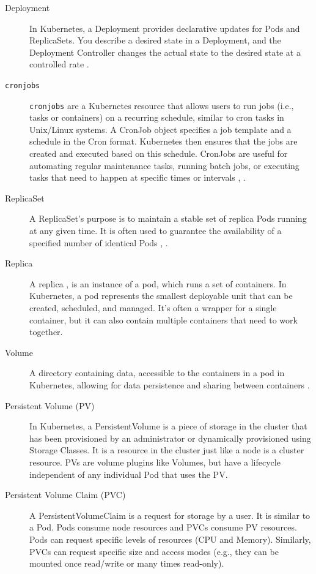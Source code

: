 \documentclass{article}
\begin{document}
\begin{description}
    \item[Deployment] In Kubernetes, a Deployment provides declarative updates for Pods and ReplicaSets. You describe a desired state in a Deployment, and the Deployment Controller changes the actual state to the desired state at a controlled rate \cite{azure}. 
    \item[\texttt{cronjobs}] \texttt{cronjobs} are a Kubernetes resource that allows users to run jobs (i.e., tasks or containers) on a recurring schedule, similar to cron tasks in Unix/Linux systems. A CronJob object specifies a job template and a schedule in the Cron format. Kubernetes then ensures that the jobs are created and executed based on this schedule. CronJobs are useful for automating regular maintenance tasks, running batch jobs, or executing tasks that need to happen at specific times or intervals \cite{azure}, \cite{cronjob}. 
    \item[ReplicaSet] A ReplicaSet's purpose is to maintain a stable set of replica Pods running at any given time. It is often used to guarantee the availability of a specified number of identical Pods \cite{azure}, \cite{kuber}. 
    
    \item[Replica]  A replica \cite{azure}, \cite{kuber} is an instance of a pod, which runs a set of containers. In Kubernetes, a pod represents the smallest deployable unit that can be created, scheduled, and managed. It's often a wrapper for a single container, but it can also contain multiple containers that need to work together. 

    \item[Volume] A directory containing data, accessible to the containers in a pod in Kubernetes, allowing for data persistence and sharing between containers \cite{kuber}. 

    \item[Persistent Volume (PV)] In Kubernetes, a PersistentVolume \cite{kupv} is a piece of storage in the cluster that has been provisioned by an administrator or dynamically provisioned using Storage Classes. It is a resource in the cluster just like a node is a cluster resource. PVs are volume plugins like Volumes, but have a lifecycle independent of any individual Pod that uses the PV.  

    \item[Persistent Volume Claim (PVC)] A PersistentVolumeClaim \cite{kupv} is a request for storage by a user. It is similar to a Pod. Pods consume node resources and PVCs consume PV resources. Pods can request specific levels of resources (CPU and Memory). Similarly, PVCs can request specific size and access modes (e.g., they can be mounted once read/write or many times read-only).  


\end{description}
\end{document}
